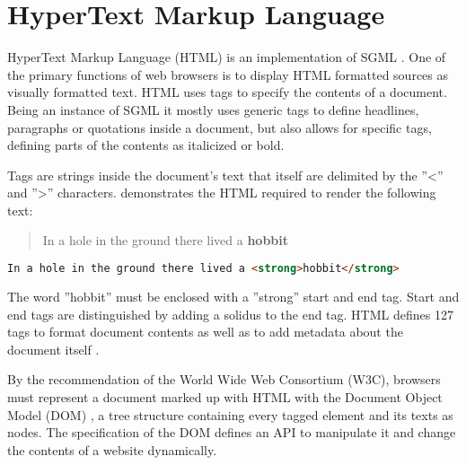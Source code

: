 






\section{HyperText Markup Language}

\label{sec:html_sgml_def}

HyperText Markup Language (HTML) is an implementation of SGML \cite[SGML and HTML]{HTML401}. One of the primary functions of web browsers is to display HTML formatted sources as visually formatted text. HTML uses tags to specify the contents of a document. Being an instance of SGML it mostly uses generic tags to define headlines, paragraphs or quotations inside a document, but also allows for specific tags, defining parts of the contents as italicized or bold.

Tags are strings inside the document's text that itself are delimited by the ''<'' and ''>'' characters.  demonstrates the HTML required to render the following text:

\begin{quotation}
In a hole in the ground there lived a \textbf{hobbit}
\end{quotation}

\begin{lstlisting}[language=html, caption=Text formatted as bold with the ''strong'' tag, label=lst:html_markup_bold_example]
In a hole in the ground there lived a <strong>hobbit</strong>
\end{lstlisting}

The word ''hobbit'' must be enclosed with a ''strong'' start and end tag. Start and end tags are distinguished by adding a solidus to the end tag. HTML defines 127 tags to format document contents as well as to add metadata about the document itself \cite{mozel}.

By the recommendation of the World Wide Web Consortium (W3C), browsers must represent a document marked up with HTML with the Document Object Model (DOM) \cite{DOM1}, a tree structure containing every tagged element and its texts as nodes. The specification of the DOM defines an API to manipulate it and change the contents of a website dynamically.

